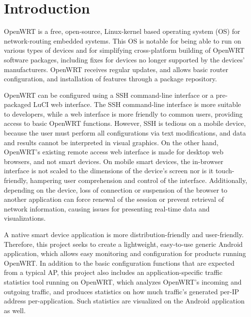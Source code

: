 \section{Introduction}
	
OpenWRT is a free, open-source, Linux-kernel based operating system (OS) for network-routing embedded systems. This OS is notable for being able to run on various types of devices and for simplifying cross-platform building of OpenWRT software packages, including fixes for devices no longer supported by the devices' manufacturers. OpenWRT receives regular updates, and allows basic router configuration, and installation of features through a package repository.

OpenWRT can be configured using a SSH command-line interface or a pre-packaged LuCI web interface. The SSH command-line interface is more suitable to developers, while a web interface is more friendly to common users, providing access to basic OpenWRT functions. However, SSH is tedious on a mobile device, because the user must perform all configurations via text modifications, and data and results cannot be interpreted in visual graphics. On the other hand, OpenWRT's existing remote access web interface is made for desktop web browsers, and not smart devices. On mobile smart devices, the in-browser interface is not scaled to the dimensions of the device's screen nor is it touch-friendly, hampering user comprehension and control of the interface. Additionally, depending on the device, loss of connection or suspension of the browser to another application can force renewal of the session or prevent retrieval of network information, causing issues for presenting real-time data and visualizations.
	
A native smart device application is more distribution-friendly and user-friendly. Therefore, this project seeks to create a lightweight, easy-to-use generic Android application, which allows easy monitoring and configuration for products running OpenWRT. In addition to the basic configuration functions that are expected from a typical AP, this project also includes an application-specific traffic statistics tool running on OpenWRT, which analyzes OpenWRT's incoming and outgoing traffic, and produces statistics on how much traffic's generated per-IP address per-application. Such statistics are visualized on the Android application as well.